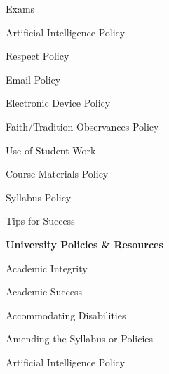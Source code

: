 \documentclass[11pt,letterpaper]{article}
\begin{document}
\begin{minipage}[t]{0.45\textwidth}
\hspace{0.3cm} Exams \dotfill \pageref{exams} \par
\hspace{0.3cm} Artificial Intelligence Policy \dotfill \pageref{ai_policy} \par
\hspace{0.3cm} Respect Policy \dotfill \pageref{respect} \par
\hspace{0.3cm} Email Policy \dotfill \pageref{email_policy} \par 
\hspace{0.3cm} Electronic Device Policy \dotfill \pageref{electronic} \par
\hspace{0.3cm} Faith/Tradition Observances Policy \dotfill \pageref{faith} \par
\hspace{0.3cm} Use of Student Work \dotfill \pageref{std_work} \par
\end{minipage} \hfill \begin{minipage}[t]{0.45\textwidth} \par %
\hspace{0.3cm} Course Materials Policy \dotfill \pageref{copyright} \par
\hspace{0.3cm} Syllabus Policy \dotfill \pageref{syllabus} \par
\hspace{0.3cm} Tips for Success \dotfill \pageref{tips} \par
{\bfseries\color{scred} University Policies \& Resources} \dotfill \pageref{univ_policies} \par
\hspace{0.3cm} Academic Integrity \dotfill \pageref{univ_academicintegrity} \par
\hspace{0.3cm} Academic Success \dotfill \pageref{univ_success} \par
\hspace{0.3cm} Accommodating Disabilities \dotfill \pageref{univ_ada} \par
\hspace{0.3cm} Amending the Syllabus or Policies \dotfill \pageref{univ_amending} \par
\hspace{0.3cm} Artificial Intelligence Policy \dotfill \pageref{univ_artintel} \par

\end{minipage}
\end{document}
